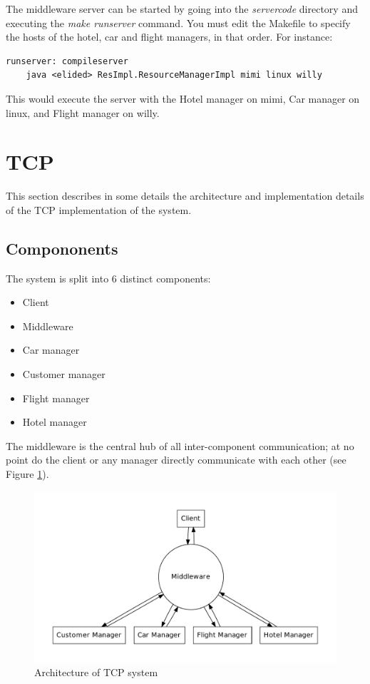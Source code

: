 \documentclass[11pt]{article}
\begin{document}
The middleware server can be started by going into the {\it
  servercode} directory and executing the {\it make runserver}
command.  You must edit the Makefile to specify the hosts of the
hotel, car and flight managers, in that order.  For instance:


\begin{verbatim}
runserver: compileserver
    java <elided> ResImpl.ResourceManagerImpl mimi linux willy
\end{verbatim}

This would execute the server with the Hotel manager on mimi, Car
manager on linux, and Flight manager on willy.



\section{TCP}

This section describes in some details the architecture and
implementation details of the TCP implementation of the system.


\subsection{Compononents}

The system is split into 6 distinct components:

\begin{itemize}
\item Client
\item Middleware
\item Car manager
\item Customer manager
\item Flight manager
\item Hotel manager
\end{itemize}

The middleware is the central hub of all inter-component
communication; at no point do the client or any manager directly
communicate with each other (see Figure \ref{fig:tcp}).


\begin{figure}[h]
  \begin{center}
    \caption{Architecture of TCP system \label{fig:tcp} }
    \includegraphics[scale=0.4]{tcp-diagram.pdf}
  \end{center}
\end{figure}
\end{document}

